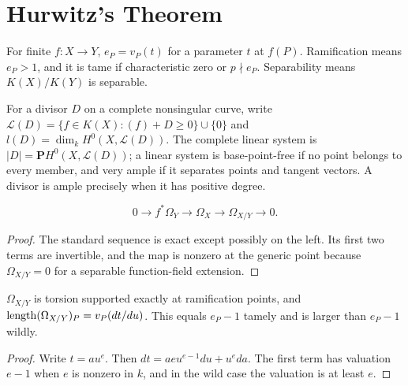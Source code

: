 \section{Hurwitz's Theorem}
\label{ha-ch4-s2}
\begin{definition}[Ramification]\label{ha-ch4-d2}
For finite \(f:X\to Y\), \(e_P=v_P(t)\) for a parameter \(t\) at \(f(P)\).
Ramification means \(e_P>1\), and it is tame if characteristic zero or
\(p\nmid e_P\).  Separability means \(K(X)/K(Y)\) is separable.
\end{definition}

\begin{definition}
\label{ha-ch4-def-divisors}
For a divisor $D$ on a complete nonsingular curve, write
$\mathcal L(D)=\{f\in K(X):(f)+D\ge0\}\cup\{0\}$ and
$l(D)=\dim_kH^0(X,\mathcal L(D))$.  The complete linear system is
$|D|=\mathbf P H^0(X,\mathcal L(D))$; a linear system is base-point-free if
no point belongs to every member, and very ample if it separates points and
tangent vectors.  A divisor is ample precisely when it has positive degree.
\end{definition}

\begin{proposition}\label{ha-ch4-p21}
\[
0\to f^*\Omega_Y\to\Omega_X\to\Omega_{X/Y}\to0.
\]
\end{proposition}
\begin{proof}
The standard sequence is exact except possibly on the left.  Its first two
terms are invertible, and the map is nonzero at the generic point because
\(\Omega_{X/Y}=0\) for a separable function-field extension.
\end{proof}

\begin{proposition}[Different]\label{ha-ch4-p22}
\(\Omega_{X/Y}\) is torsion supported exactly at ramification points, and
\(\operatorname{length}(\Omega_{X/Y})_P=v_P(dt/du)\).  This equals \(e_P-1\) tamely and is
larger than \(e_P-1\) wildly.
\end{proposition}
\begin{proof}
Write \(t=au^e\).  Then \(dt=aeu^{e-1}du+u^e da\).  The first term has
valuation \(e-1\) when \(e\) is nonzero in \(k\), and in the wild case the
valuation is at least \(e\).
\end{proof}

